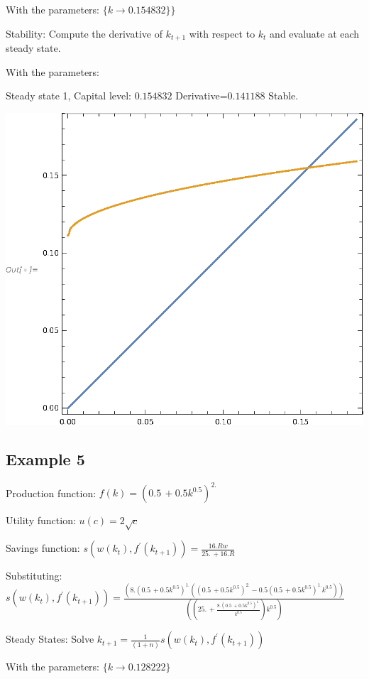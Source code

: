 \documentclass[11pt, a4paper]{article}
\begin{document}
With the parameters: $\{k\to 0.154832\}\}$

Stability:             Compute the derivative of $k_{t+1}$ with respect to $k_{t}$ and evaluate at each steady state.

With the parameters:

\quad Steady state 1, Capital level: $0.154832$ Derivative=$0.141188$  Stable.

\includegraphics{xamples_gr4.eps}

\subsection*{Example 5}
Production function:    $f(k)=\left(0.5\, +0.5 k^{0.5}\right)^{2.}$

Utility function:       $u(c)=2 \sqrt{c}$

Savings function:       $s(w(k_t),f^\prime(k_{t+1}))= \frac{16. R w}{25.\, +16. R}$

Substituting:           $s(w(k_t),f^\prime(k_{t+1}))= \frac{\left(8. \left(0.5\, +0.5 k^{0.5}\right)^{1.} \left(\left(0.5\, +0.5 k^{0.5}\right)^{2.}-0.5 \left(0.5\, +0.5 k^{0.5}\right)^{1.} k^{0.5}\right)\right)}{\left(\left(25.\, +\frac{8. \left(0.5\, +0.5 k^{0.5}\right)^{1.}}{k^{0.5}}\right) k^{0.5}\right)}$

Steady States:          Solve ${k}_{t+1}= \frac{1}{(1+n)}s(w(k_t),f^\prime(k_{t+1}))$

With the parameters: $\{k\to 0.128222\}$
\end{document}
